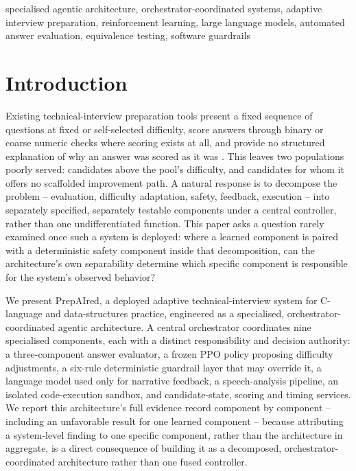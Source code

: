 \documentclass[conference]{IEEEtran}
\begin{document}
\begin{IEEEkeywords}
specialised agentic architecture, orchestrator-coordinated systems, adaptive interview preparation, reinforcement learning, large language models, automated answer evaluation, equivalence testing, software guardrails
\end{IEEEkeywords}

\section{Introduction}

Existing technical-interview preparation tools present a fixed sequence of questions at fixed or self-selected difficulty, score answers through binary or coarse numeric checks where scoring exists at all, and provide no structured explanation of why an answer was scored as it was \cite{weiss1982}. This leaves two populations poorly served: candidates above the pool's difficulty, and candidates for whom it offers no scaffolded improvement path. A natural response is to decompose the problem -- evaluation, difficulty adaptation, safety, feedback, execution -- into separately specified, separately testable components under a central controller, rather than one undifferentiated function. This paper asks a question rarely examined once such a system is deployed: where a learned component is paired with a deterministic safety component inside that decomposition, can the architecture's own separability determine which specific component is responsible for the system's observed behavior?

We present PrepAIred, a deployed adaptive technical-interview system for C-language and data-structures practice, engineered as a specialised, orchestrator-coordinated agentic architecture. A central orchestrator coordinates nine specialised components, each with a distinct responsibility and decision authority: a three-component answer evaluator, a frozen PPO \cite{schulman2017} policy proposing difficulty adjustments, a six-rule deterministic guardrail layer that may override it, a language model used only for narrative feedback, a speech-analysis pipeline, an isolated code-execution sandbox, and candidate-state, scoring and timing services. We report this architecture's full evidence record component by component -- including an unfavorable result for one learned component -- because attributing a system-level finding to one specific component, rather than the architecture in aggregate, is a direct consequence of building it as a decomposed, orchestrator-coordinated architecture rather than one fused controller.
\end{document}
